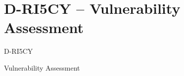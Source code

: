 \section{D-RI5CY -- Vulnerability Assessment}

\begin{frame}{D-RI5CY}
    
\end{frame}
\begin{frame}{Vulnerability Assessment}
    
\end{frame}
